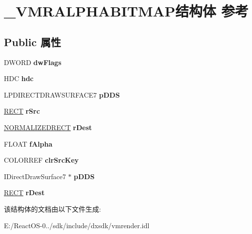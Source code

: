\hypertarget{struct___v_m_r_a_l_p_h_a_b_i_t_m_a_p}{}\section{\+\_\+\+V\+M\+R\+A\+L\+P\+H\+A\+B\+I\+T\+M\+A\+P结构体 参考}
\label{struct___v_m_r_a_l_p_h_a_b_i_t_m_a_p}
\subsection*{Public 属性}
\begin{DoxyCompactItemize}
\item 
\mbox{\label{struct___v_m_r_a_l_p_h_a_b_i_t_m_a_p_abf3e0ec07af0f6cf6fa4023521731ee7}} 
D\+W\+O\+RD {\bfseries dw\+Flags}
\item 
\mbox{\label{struct___v_m_r_a_l_p_h_a_b_i_t_m_a_p_a388311314cf59b3846ce5c83fd0b87ab}} 
H\+DC {\bfseries hdc}
\item 
\mbox{\label{struct___v_m_r_a_l_p_h_a_b_i_t_m_a_p_a788cbb6904b898887c0a9734108cdddc}} 
L\+P\+D\+I\+R\+E\+C\+T\+D\+R\+A\+W\+S\+U\+R\+F\+A\+C\+E7 {\bfseries p\+D\+DS}
\item 
\mbox{\label{struct___v_m_r_a_l_p_h_a_b_i_t_m_a_p_afc96afcab78a5f332b54f2ee5a1519f3}} 
\hyperlink{structtag_r_e_c_t}{R\+E\+CT} {\bfseries r\+Src}
\item 
\mbox{\label{struct___v_m_r_a_l_p_h_a_b_i_t_m_a_p_aaf3bd4d1797de6431de9a198a4b5d4d2}} 
\hyperlink{struct___n_o_r_m_a_l_i_z_e_d_r_e_c_t}{N\+O\+R\+M\+A\+L\+I\+Z\+E\+D\+R\+E\+CT} {\bfseries r\+Dest}
\item 
\mbox{\label{struct___v_m_r_a_l_p_h_a_b_i_t_m_a_p_ae3ebc6629b02bc0b3e5b149b087f2522}} 
F\+L\+O\+AT {\bfseries f\+Alpha}
\item 
\mbox{\label{struct___v_m_r_a_l_p_h_a_b_i_t_m_a_p_a9716372c2681086846e9cd7a904b28bd}} 
C\+O\+L\+O\+R\+R\+EF {\bfseries clr\+Src\+Key}
\item 
\mbox{\label{struct___v_m_r_a_l_p_h_a_b_i_t_m_a_p_a5e168a11c58aef1c06932dc8f921ff2c}} 
I\+Direct\+Draw\+Surface7 $\ast$ {\bfseries p\+D\+DS}
\item 
\mbox{\label{struct___v_m_r_a_l_p_h_a_b_i_t_m_a_p_adad47c6b893db71d25ea9decf8b5d33b}} 
\hyperlink{structtag_r_e_c_t}{R\+E\+CT} {\bfseries r\+Dest}
\end{DoxyCompactItemize}


该结构体的文档由以下文件生成\+:\begin{DoxyCompactItemize}
\item 
E\+:/\+React\+O\+S-\/0../sdk/include/dxsdk/vmrender.\+idl\end{DoxyCompactItemize}
